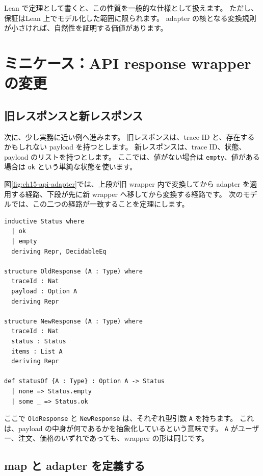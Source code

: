 Lean で定理として書くと、この性質を一般的な仕様として扱えます。
ただし、保証はLean 上でモデル化した範囲に限られます。
adapter の核となる変換規則が小さければ、自然性を証明する価値があります。

\section{ミニケース：API response wrapper の変更}

\subsection{旧レスポンスと新レスポンス}

次に、少し実務に近い例へ進みます。
旧レスポンスは、trace ID と、存在するかもしれない payload を持つとします。
新レスポンスは、trace ID、状態、payload のリストを持つとします。
ここでは、値がない場合は \texttt{empty}、値がある場合は \texttt{ok} という単純な状態を使います。

図\ref{fig:ch15-api-adapter}では、上段が旧 wrapper 内で変換してから adapter を適用する経路、下段が先に新 wrapper へ移してから変換する経路です。
次のモデルでは、この二つの経路が一致することを定理にします。


\begin{listing}[htbp]
\begin{verbatim}
inductive Status where
  | ok
  | empty
  deriving Repr, DecidableEq

structure OldResponse (A : Type) where
  traceId : Nat
  payload : Option A
  deriving Repr

structure NewResponse (A : Type) where
  traceId : Nat
  status : Status
  items : List A
  deriving Repr

def statusOf {A : Type} : Option A -> Status
  | none => Status.empty
  | some _ => Status.ok
\end{verbatim}
\caption{\texttt{OldResponse} と \texttt{NewResponse}}
\label{lst:ch15_api_model}
\end{listing}

ここで \texttt{OldResponse} と \texttt{NewResponse} は、それぞれ型引数 \texttt{A} を持ちます。
これは、payload の中身が何であるかを抽象化しているという意味です。
\texttt{A} がユーザー、注文、価格のいずれであっても、wrapper の形は同じです。

\subsection{map と adapter を定義する}

